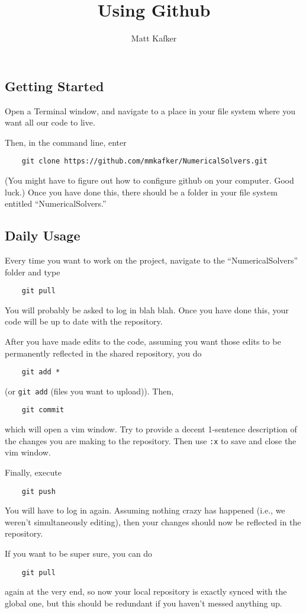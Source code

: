 \documentclass[10pt]{article}
\title {Using Github}
\author{Matt Kafker}
\begin{document}
\maketitle

\subsection*{Getting Started}
Open a Terminal window, and navigate to a place in your file system where you want all our code to live.

Then, in the command line, enter


\begin{verbatim}
	git clone https://github.com/mmkafker/NumericalSolvers.git
\end{verbatim}

(You might have to figure out how to configure github on your computer. Good luck.) Once you have done this, there should be a folder in your file system entitled ``NumericalSolvers.''

\subsection*{Daily Usage}
Every time you want to work on the project, navigate to the ``NumericalSolvers'' folder and type 

\begin{verbatim}
	git pull
\end{verbatim}
You will probably be asked to log in blah blah. Once you have done this, your code will be up to date with the repository.    

After you have made edits to the code, assuming you want those edits to be permanently reflected in the shared repository, you do

\begin{verbatim}
	git add *
\end{verbatim}
(or \verb|git add| (files you want to upload)). Then,
\begin{verbatim}
	git commit
\end{verbatim}
which will open a vim window. Try to provide a decent 1-sentence description of the changes you are making to the repository. Then use \verb|:x| to save and close the vim window.

Finally, execute
\begin{verbatim}
	git push
\end{verbatim}
You will have to log in again. Assuming nothing crazy has happened (i.e., we weren't simultaneously editing), then your changes should now be reflected in the repository.

If you want to be super sure, you can do 
\begin{verbatim}
	git pull
\end{verbatim}
again at the very end, so now your local repository is exactly synced with the global one, but this should be redundant if you haven't messed anything up.

    
    
\end{document}
